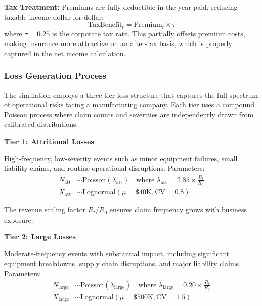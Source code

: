 \documentclass[11pt,letterpaper]{article}
\begin{document}
\textbf{Tax Treatment:} Premiums are fully deductible in the year paid, reducing taxable income dollar-for-dollar:
\begin{equation}
\text{TaxBenefit}_t = \text{Premium}_t \times \tau
\end{equation}
where $\tau = 0.25$ is the corporate tax rate. This partially offsets premium costs, making insurance more attractive on an after-tax basis, which is properly captured in the net income calculation.

\subsubsection{Loss Generation Process}
\label{sec:loss-gen}

The simulation employs a three-tier loss structure that captures the full spectrum of operational risks facing a manufacturing company. Each tier uses a compound Poisson process where claim counts and severities are independently drawn from calibrated distributions.

\vspace{\baselineskip}

\textbf{Tier 1: Attritional Losses}

High-frequency, low-severity events such as minor equipment failures, small liability claims, and routine operational disruptions. Parameters:
\begin{align}
N_{\text{att}} &\sim \text{Poisson}(\lambda_{\text{att}}) \quad \text{where } \lambda_{\text{att}} = 2.85 \times \frac{R_t}{R_0} \\
X_{\text{att}} &\sim \text{Lognormal}(\mu = \$40\text{K}, \text{CV} = 0.8)
\end{align}

The revenue scaling factor $R_t / R_0$ ensures claim frequency grows with business exposure.

\vspace{\baselineskip}

\textbf{Tier 2: Large Losses}

Moderate-frequency events with substantial impact, including significant equipment breakdowns, supply chain disruptions, and major liability claims. Parameters:
\begin{align}
N_{\text{large}} &\sim \text{Poisson}(\lambda_{\text{large}}) \quad \text{where } \lambda_{\text{large}} = 0.20 \times \frac{R_t}{R_0} \\
X_{\text{large}} &\sim \text{Lognormal}(\mu = \$500\text{K}, \text{CV} = 1.5)
\end{align}
\end{document}
